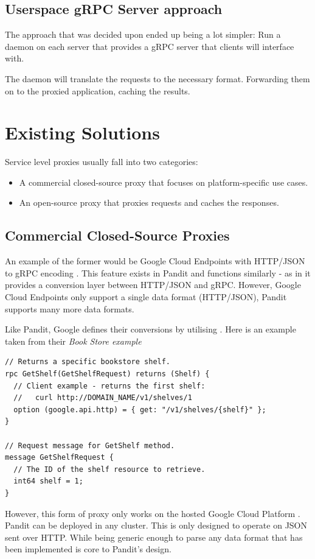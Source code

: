 \documentclass[a4paper,12pt]{report}
\begin{document}
\subsection{Userspace gRPC Server approach}
\label{sec:user}
The approach that was decided upon ended up being a lot simpler:
Run a daemon on each server that provides a gRPC server that clients will interface with. 

The daemon will translate the requests to the necessary format. Forwarding them on to the proxied application, caching the results.

\section{Existing Solutions}
\label{sec:solutions}
Service level proxies usually fall into two categories:
\begin{itemize}
    \item A commercial closed-source proxy that focuses on platform-specific use cases.
    \item An open-source proxy that proxies requests and caches the responses.
\end{itemize}
\subsection{Commercial Closed-Source Proxies}
An example of the former would be Google Cloud Endpoints with HTTP/JSON to gRPC encoding \cite{cloud_endpoints}.
This feature exists in Pandit and functions similarly - as in it provides a conversion layer between
HTTP/JSON and gRPC. However, Google Cloud Endpoints only support a single data format (HTTP/JSON), Pandit supports
many more data formats.

Like Pandit, Google defines their conversions by utilising . Here is an example taken from their \textit{Book Store example \cite{bookstore}}

\begin{lstlisting}
// Returns a specific bookstore shelf.
rpc GetShelf(GetShelfRequest) returns (Shelf) {
  // Client example - returns the first shelf:
  //   curl http://DOMAIN_NAME/v1/shelves/1
  option (google.api.http) = { get: "/v1/shelves/{shelf}" };
}

// Request message for GetShelf method.
message GetShelfRequest {
  // The ID of the shelf resource to retrieve.
  int64 shelf = 1;
}
\end{lstlisting}

However, this form of proxy only works on the hosted Google Cloud Platform \cite{google_cloud_platform}. Pandit can be deployed
in any cluster.
This is only designed to operate on JSON sent over HTTP. While being generic enough to parse any data format that has been implemented is
core to Pandit's design.
\end{document}

